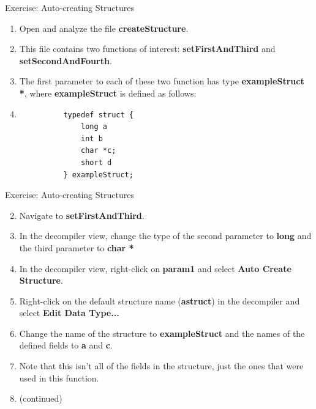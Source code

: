 \documentclass{beamer}
\begin{document}
\begin{frame}[fragile]
\begin{block}{Exercise: Auto-creating Structures}
\begin{enumerate}
\item Open and analyze the file \textbf{createStructure}.
\item[] This file contains two functions of interest: \textbf{setFirstAndThird} and \textbf{setSecondAndFourth}.
\item[] The first parameter to each of these two function has type \textbf{exampleStruct *}, where \textbf{exampleStruct} is defined as follows:
\item[] \begin{verbatim}
          typedef struct {
              long a
              int b
              char *c;
              short d
          } exampleStruct;
\end{verbatim}
\end{enumerate}
\end{block}
\end{frame}

\begin{frame}
\begin{block}{Exercise: Auto-creating Structures}
\begin{enumerate}
\setcounter{enumi}{1}
\item Navigate to \textbf{setFirstAndThird}.
\item In the decompiler view, change the type of the second parameter to \textbf{long} and the third parameter to \textbf{char *}
\item In the decompiler view, right-click on \textbf{param1} and select \textbf{Auto Create Structure}.
\item Right-click on the default structure name (\textbf{astruct}) in the decompiler and select \textbf{Edit Data Type...}
\item Change the name of the structure to \textbf{exampleStruct} and the names of the defined fields to \textbf{a} and \textbf{c}.
\item Note that this isn't all of the fields in the structure, just the ones that were used in this function.
\item[] (continued)
\end{enumerate}
\end{block}
\end{frame}
\end{document}

